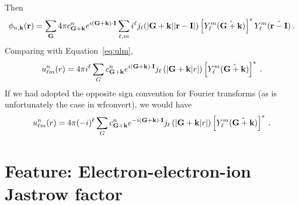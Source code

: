 Then
\begin{equation}
\phi_{n,\mathbf{k}}(\mathbf{r}) =  \sum_{\mathbf{G}} 4\pi c_{\mathbf{G}+\mathbf{k}}^n
e^{i(\mathbf{G}+\mathbf{k})\cdot\mathbf{I}} \sum_{\ell,m}
  i^\ell j_\ell(|\mathbf{G} +\mathbf{k}||\mathbf{r}-\mathbf{I}|)
  \left[Y_\ell^m(\hat{\mathbf{G}+\mathbf{k}})\right]^*
Y_\ell^m(\hat{\mathbf{r} - \mathbf{I}})\:.
\end{equation}
Comparing with Equation~\ref{eq:ulm},
\begin{equation}
u_{\ell m}^n(r) = 4\pi i^\ell \sum_G c_{\mathbf{G}+\mathbf{k}}^n e^{i(\mathbf{G}+\mathbf{k})\cdot\mathbf{I}}  j_\ell\left(|\mathbf{G} + \mathbf{k}|r|\right)
\left[Y_\ell^m(\hat{\mathbf{G} + \mathbf{k}})\right]^*\:.
\end{equation}
If we had adopted the opposite sign convention for Fourier transforms
(as is unfortunately the case in wfconvert), we would have
\begin{equation}
u_{\ell m}^n(r) = 4\pi (-i)^\ell \sum_G c_{\mathbf{G}+\mathbf{k}}^n e^{-i(\mathbf{G}+\mathbf{k})\cdot\mathbf{I}}  j_\ell\left(|\mathbf{G} + \mathbf{k}|r|\right)
\left[Y_\ell^m(\hat{\mathbf{G} + \mathbf{k}})\right]^*\:.
\end{equation}



\section{Feature: Electron-electron-ion Jastrow factor}



